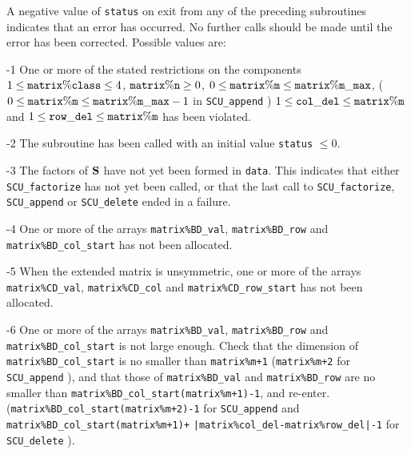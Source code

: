 \documentclass{galahad}
\newcommand{\packagename}{SCU}
\begin{document}

\galerrors
A negative value of {\tt status} on exit from any of the preceding subroutines
indicates that an error has occurred. No further calls should be made
until the error has been corrected. Possible values are:

\begin{description}

\item{-1} One or more of the stated restrictions on the components 
$1 \leq  {\tt  matrix\%class} \leq 4$, 
${\tt matrix\%n} \geq 0$,
$0 \leq {\tt matrix\%m} \\ \leq {\tt matrix\%m\_max}$,
($0 \leq {\tt matrix\%m} \leq {\tt matrix\%m\_max}-1$ in 
{\tt \packagename\_append} ) 
$1 \leq {\tt col\_del} \leq {\tt matrix\%m}$ and 
$1 \leq {\tt row\_del} \leq {\tt matrix\%m}$
has been violated.  

\item{-2} The subroutine has been called with an initial value {\tt status} 
$\leq 0$. 

\item{-3} The factors of ${\mathbf{S}}$ have not yet been formed in {\tt data}. 
This indicates that either  
{\tt \packagename\_factorize} has not yet been called, or that the last call to 
{\tt \packagename\_factorize}, {\tt \packagename\_append} or 
{\tt \packagename\_delete} 
ended in a failure.  

\item{-4} One or more of the arrays {\tt matrix\%BD\_val}, 
{\tt matrix\%BD\_row} and 
{\tt matrix\%BD\_col\_start} has not been allocated. 

\item{-5} When the extended matrix is unsymmetric, one or more of the arrays  
{\tt matrix\%CD\_val}, {\tt matrix\%CD\_col} and 
{\tt matrix\%CD\_row\_start} has not been allocated. 

\item{-6} One or more of the arrays {\tt matrix\%BD\_val}, 
{\tt matrix\%BD\_row} and 
{\tt matrix\%BD\_col\_start} is not large enough. Check that the dimension 
of {\tt matrix\%BD\_col\_start} is no smaller than  
{\tt matrix\%m+1} 
({\tt matrix\%m+2} for {\tt \packagename\_a\-pp\-end} ), 
and that those of  
{\tt matrix\%BD\_val} and {\tt matrix\%BD\_row} are no smaller than 
{\tt matrix\%BD\_col\_start(mat\-rix\%m+1)-1}, and re-enter. 
({\tt matrix\%BD\_col\_start(matrix\%m+2)-1} for {\tt \packagename\_append} 
and {\tt matrix\%BD\_col\_st\-art(matrix\%m+1)+} 
{\tt |matrix\%col\_del-matrix\%row\_del|-1} for {\tt \packagename\_delete} ). 


\end{description}
\end{document}
